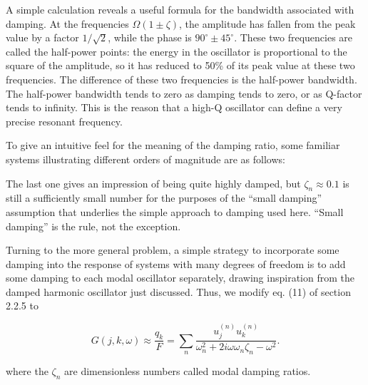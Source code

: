   A simple calculation reveals a useful formula for the bandwidth associated 
  with damping. At the frequencies $\Omega(1 \pm \zeta)$, the amplitude has 
  fallen from the peak value by a factor $1/\sqrt{2}$, while the phase is 
  $90^\circ \pm 45^\circ$. These two frequencies are called the half-power 
  points: the energy in the oscillator is proportional to the square of the 
  amplitude, so it has reduced to 50\% of its peak value at these two 
  frequencies. The difference of these two frequencies is the half-power 
  bandwidth. The half-power bandwidth tends to zero as damping tends to zero, 
  or as Q-factor tends to infinity. This is the reason that a high-Q oscillator 
  can define a very precise resonant frequency. 

  To give an intuitive feel for the meaning of the damping ratio, some familiar 
  systems illustrating different orders of magnitude are as follows: 

  The last one gives an impression of being quite highly damped, but $\zeta_n 
  \approx 0.1$ is still a sufficiently small number for the purposes of the 
  ``small damping'' assumption that underlies the simple approach to damping 
  used here. ``Small damping'' is the rule, not the exception. 

  Turning to the more general problem, a simple strategy to incorporate some 
  damping into the response of systems with many degrees of freedom is to add 
  some damping to each modal oscillator separately, drawing inspiration from 
  the damped harmonic oscillator just discussed. Thus, we modify eq. (11) of 
  section 2.2.5 to 

  \begin{equation*}G(j,k,\omega) \approx \dfrac{q_k}{F}=\sum_n 
  \dfrac{u_j^{(n)}u_k^{(n)}}{\omega_n^2+2i\omega \omega_n \zeta_n-\omega^2}. 
  \tag{12}\end{equation*} 

  \noindent{}where the $\zeta_n$ are dimensionless numbers called modal damping 
  ratios. 
